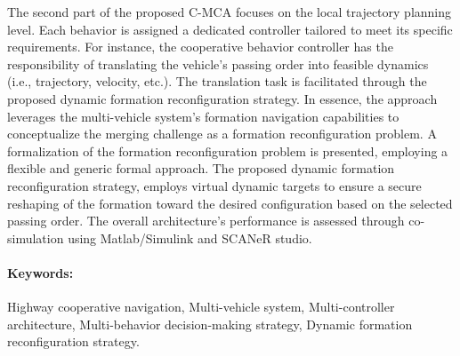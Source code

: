  The second part of the proposed C-MCA focuses on the local trajectory planning level. Each behavior is assigned a dedicated controller tailored to meet its specific requirements. For instance, the cooperative behavior controller has the responsibility of translating the vehicle's passing order into feasible dynamics (i.e., trajectory, velocity, etc.). The translation task is facilitated through the proposed dynamic formation reconfiguration strategy. In essence, the approach leverages the multi-vehicle system's formation navigation capabilities to conceptualize the merging challenge as a formation reconfiguration problem. A formalization of the formation reconfiguration problem is presented, employing a flexible and generic formal approach. The proposed dynamic formation reconfiguration strategy, employs virtual dynamic targets to ensure a secure reshaping of the formation toward the desired configuration based on the selected passing order. The overall architecture's performance is assessed through co-simulation using Matlab/Simulink and SCANeR studio. 
 
 
 


 
 \paragraph*{Keywords: } Highway cooperative navigation, Multi-vehicle system, Multi-controller architecture, Multi-behavior decision-making strategy, Dynamic formation reconfiguration strategy. 
 

 
